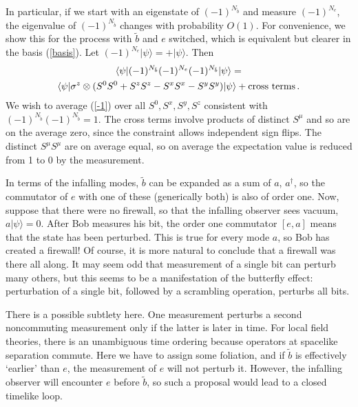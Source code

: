 \documentclass[12pt]{article}
\begin{document}
In particular, if we start with an eigenstate of $(-1)^{N_{\tilde b}}$ and measure $(-1)^{N_{e}}$, the eigenvalue of $(-1)^{N_{\tilde b}}$ changes with probability $O(1)$.  For convenience, we show this for the process with $\tilde b$ and $e$ switched, which is equivalent but clearer in the basis (\ref{basis}).  Let $(-1)^{N_e} |\psi\rangle = +  |\psi\rangle$.  Then
\begin{multline}
\label{-1}
\langle \psi | (-1)^{N_{\tilde b}} (-1)^{N_e} (-1)^{N_{\tilde b}} |\psi\rangle
= \\
\langle \psi |  \sigma^z \otimes( S^0 S^0 + S^z S^z - S^x S^x - S^y S^y )  |\psi\rangle + {\rm cross\ terms} \,.
\end{multline}
We wish to average (\ref{-1}) over all $S^0,S^x,S^y,S^z$ consistent with $(-1)^{N_{\tilde b}} (-1)^{N_{\tilde b}} = 1$.
The cross terms involve products of distinct $S^\mu$ and so are on the average zero, since the constraint allows independent sign flips.  The distinct $S^\mu S^\mu$ are on average equal, so on average the expectation value is reduced from 1 to 0 by the measurement.


In terms of the infalling modes, $\tilde b$ can be expanded as a sum of $a$, $a^\dagger$, so the commutator of $e$ with one of these (generically both) is also of order one.
Now, suppose that there were no firewall, so that the infalling observer sees vacuum, $a |\psi \rangle = 0$.  After Bob measures his bit, the order one commutator $[e,a]$ means that the state has been perturbed.  This is true for every mode $a$, so Bob has created a firewall!  Of course, it is more natural to conclude that a firewall was there all along.  It may seem odd that measurement of a single bit can perturb many others, but this seems to be a manifestation of the butterfly effect: perturbation of a single bit, followed by a scrambling operation, perturbs all bits.

There is a possible subtlety here.  One measurement perturbs a second noncommuting measurement only if the latter is later in time.  For local field theories, there is an unambiguous time ordering because operators at spacelike separation commute.  Here we have to assign some foliation, and if $\tilde b$ is effectively `earlier' than $e$, the measurement of $e$ will not perturb it.  However, the infalling observer will encounter $e$ before $\tilde b$, so such a proposal would lead to a closed timelike loop.
\end{document}
